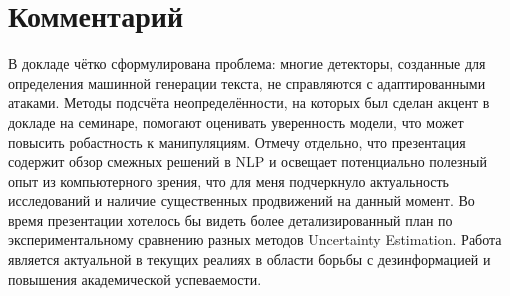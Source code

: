 \documentclass[11pt]{article}
\begin{document}
\section*{Комментарий}
В докладе чётко сформулирована проблема: многие детекторы, созданные для определения машинной генерации текста, не справляются с
адаптированными атаками. Методы подсчёта неопределённости, на которых был сделан акцент в докладе на семинаре, помогают
оценивать уверенность модели, что может повысить робастность к манипуляциям. Отмечу отдельно, что презентация содержит обзор
смежных решений в NLP и освещает потенциально полезный опыт из компьютерного зрения, что для меня подчеркнуло актуальность 
исследований и наличие существенных продвижений на данный момент. Во время презентации хотелось бы видеть более
детализированный план по экспериментальному сравнению разных методов Uncertainty Estimation. Работа является актуальной в 
текущих реалиях в области борьбы с дезинформацией и повышения академической успеваемости.
\end{document}
